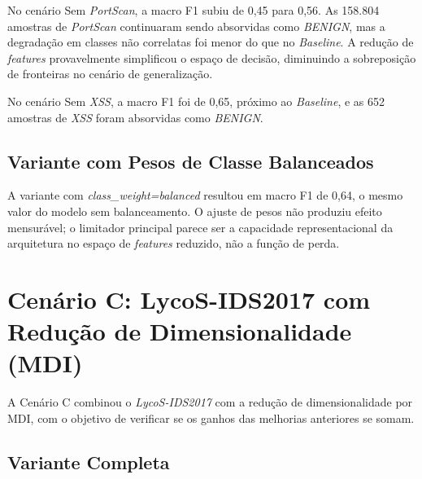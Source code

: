 







No cenário Sem \textit{PortScan}, a macro F1 subiu de 0,45 para 0,56. As 158.804 amostras de \textit{PortScan} continuaram sendo absorvidas como \textit{BENIGN}, mas a degradação em classes não correlatas foi menor do que no \textit{Baseline}. A redução de \textit{features} provavelmente simplificou o espaço de decisão, diminuindo a sobreposição de fronteiras no cenário de generalização.

No cenário Sem \textit{XSS}, a macro F1 foi de 0,65, próximo ao \textit{Baseline}, e as 652 amostras de \textit{XSS} foram absorvidas como \textit{BENIGN}.

\subsection{Variante com Pesos de Classe Balanceados}





A variante com \textit{class\_weight=balanced} resultou em macro F1 de 0,64, o mesmo valor do modelo sem balanceamento. O ajuste de pesos não produziu efeito mensurável; o limitador principal parece ser a capacidade representacional da arquitetura no espaço de \textit{features} reduzido, não a função de perda.

\section{Cenário C: LycoS-IDS2017 com Redução de Dimensionalidade (MDI)}

A Cenário C combinou o \textit{LycoS-IDS2017} com a redução de dimensionalidade por MDI, com o objetivo de verificar se os ganhos das melhorias anteriores se somam.

\subsection{Variante Completa}

